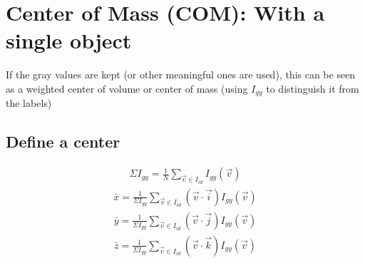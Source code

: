 \documentclass[letterpaper,10pt,english]{sphinxmanual}
\begin{document}
\noindent{}


\section{Center of Mass (COM): With a single object}
\label{\detokenize{06-ShapeAnalysis:center-of-mass-com-with-a-single-object}}
\sphinxAtStartPar
If the gray values are kept (or other meaningful ones are used), this can be seen as a weighted center of volume or center of mass (using \(I_{gy}\) to distinguish it from the labels)


\subsection{Define a center}
\label{\detokenize{06-ShapeAnalysis:id2}}\begin{equation*}
\begin{split} \Sigma I_{gy} = \frac{1}{N} \sum_{\vec{v}\in I_{id}} I_{gy}(\vec{v}) \end{split}
\end{equation*}\begin{equation*}
\begin{split} \bar{x} = \frac{1}{\Sigma I_{gy}} \sum_{\vec{v}\in I_{id}} (\vec{v}\cdot\vec{i}) I_{gy}(\vec{v}) \end{split}
\end{equation*}\begin{equation*}
\begin{split} \bar{y} = \frac{1}{\Sigma I_{gy}} \sum_{\vec{v}\in I_{id}} (\vec{v}\cdot\vec{j}) I_{gy}(\vec{v}) \end{split}
\end{equation*}\begin{equation*}
\begin{split} \bar{z} = \frac{1}{\Sigma I_{gy}} \sum_{\vec{v}\in I_{id}} (\vec{v}\cdot\vec{k}) I_{gy}(\vec{v}) \end{split}
\end{equation*}
\end{document}
